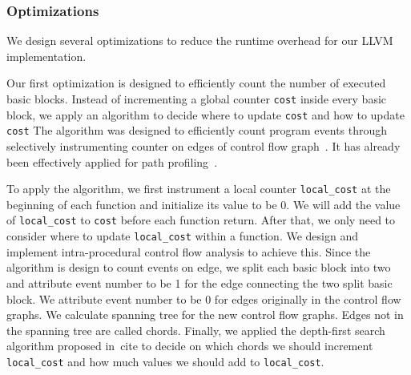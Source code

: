 
\subsubsection{Optimizations}
We design several optimizations to reduce the 
runtime overhead for our LLVM implementation. 

Our first optimization is designed to efficiently count the number of executed basic blocks.
Instead of incrementing a global counter \texttt{cost} inside every basic block, 
we apply an algorithm to decide where to update \texttt{cost} and how to update \texttt{cost}  
The algorithm was designed to efficiently count program events through selectively instrumenting counter 
on edges of control flow graph~\cite{xx}. 
It has already been effectively applied for path profiling~\cite{xx}.

To apply the algorithm, we first instrument a local counter 
\texttt{local\_cost} at the beginning of each function
and initialize its value to be 0. 
We will add the value of \texttt{local\_cost} to \texttt{cost} before 
each function return.
After that, we only need to consider where to update \texttt{local\_cost} 
within a function.
We design and implement intra-procedural 
control flow analysis to achieve this.   
Since the algorithm is design to count events on edge,
we split each basic block into two and attribute event number to be 1 
for the edge connecting the two split basic block.  
We attribute event number to be 0 for edges originally in the control flow graphs. 
We calculate spanning tree for the new control flow graphs. 
Edges not in the spanning tree are called chords.
Finally, we applied the depth-first search algorithm proposed in~cite{} to decide
on which chords we should increment 
\texttt{local\_cost} and how much values we should add to \texttt{local\_cost}.
 

